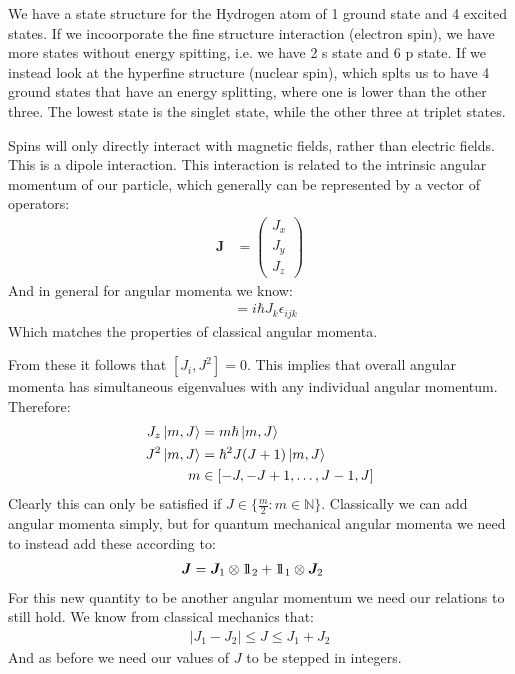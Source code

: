We have a state structure for the Hydrogen atom of 1 ground state and 4 excited states. If we incoorporate the fine structure interaction (electron spin), we have more states without energy spitting, i.e. we have 2 s state and 6 p state.
If we instead look at the hyperfine structure (nuclear spin), which splts us to have 4 ground states that have an energy splitting, where one is lower than the other three. The lowest state is the singlet state, while the other three at triplet states.

Spins will only directly interact with magnetic fields, rather than electric fields. This is a dipole interaction. This interaction is related to the intrinsic angular momentum of our particle, which generally can be represented by a vector of operators:
\begin{align*}
	\bm{J} &= \begin{pmatrix}
		J_x \\
		J_y \\
		J_z
		  \end{pmatrix}
\end{align*}
And in general for angular momenta we know:
\begin{align*}
	[J_i,J_j] &= i\hbar J_k \epsilon_{ijk}
\end{align*}
Which matches the properties of classical angular momenta. 

From these it follows that $[J_i,J^2] = 0$. This implies that overall angular momenta has simultaneous eigenvalues with any individual angular momentum. Therefore:
\begin{align*}
	J_z \ket{m,J} &= m\hbar\ket{m,J} \\
	J^2\ket{m,J} &= \hbar^2 J(J+1)\ket{m,J} \\
	m &\in [-J, -J +1,\ldots, J-1, J]
\end{align*}
Clearly this can only be satisfied if $J \in \{\frac{m}{2} :m\in \mathbb{N}\}$. Classically we can add angular momenta simply, but for quantum mechanical angular momenta we need to instead add these according to:
\begin{align*}
	\bm{J} &= \bm{J}_1 \otimes 1\!\!1_2 + 1\!\!1_1 \otimes \bm{J}_2
\end{align*}
For this new quantity to be another angular momentum we need our relations to still hold. We know from classical mechanics that:
\begin{align*}
	|J_1 - J_2| \leq J \leq J_1 + J_2
\end{align*}
And as before we need our values of $J$ to be stepped in integers.

